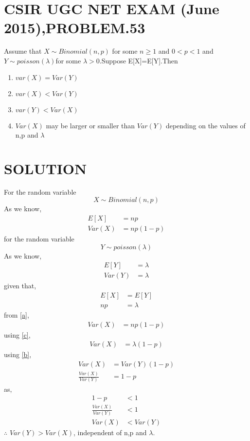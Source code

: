 \documentclass[journal,12pt,twocolumn]{IEEEtran}
\begin{document}
\section{CSIR UGC NET EXAM (June 2015),PROBLEM.53}
Assume that $X\sim Binomial(n, p)$ for some $n\geq 1$ and $0<p<1$
and $Y\sim poisson(\lambda)$for some $\lambda > 0$.Suppose E[X]=E[Y].Then
\begin{enumerate}
    \item $var(X)=Var(Y)$\\
    \item $var(X)<Var(Y)$\\
    \item $var(Y)<Var(X)$\\
    \item $Var(X)$ may be larger or smaller than $Var(Y)$ depending on the values of n,p and $\lambda$
\end{enumerate}
\section{SOLUTION}
For the random variable $$X\sim Binomial(n, p)$$
As we know,
\begin{align}
E[X]&=np\\
Var(X)&=np(1-p) \label{a}
\end{align}
for the random variable $$Y\sim poisson(\lambda)$$
As we know,
\begin{align}
E[Y]&=\lambda\\
Var(Y)&=\lambda \label{b}
\end{align}
given that,
\begin{align}
E[X]&=E[Y]\\
np&=\lambda \label{c}
\end{align}
from \eqref{a},
\begin{align}
Var(X)&=np(1-p)
\end{align}
using \eqref{c},
\begin{align}
Var(X)&=\lambda(1-p)
\end{align}
using \eqref{b},
\begin{align}
Var(X)&=Var(Y)(1-p)\\
\frac{Var(X)}{Var(Y)}&= 1-p
\end{align}
as,
\begin{align}
1-p &<1\\
\frac{Var(X)}{Var(Y)}&<1\\
Var(X) &< Var(Y)
\end{align}
$\therefore$ $Var(Y) >Var(X)$, independent of n,p and $\lambda$.
\end{document}
